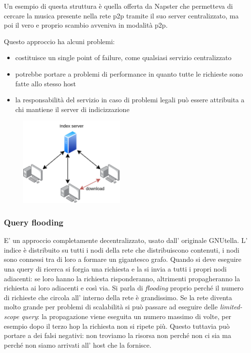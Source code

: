 Un esempio di questa struttura è quella offerta da Napster che permetteva di cercare la musica presente nella rete p2p tramite il suo server centralizzato, ma poi il vero e proprio scambio avveniva in modalità p2p.

Questo approccio ha alcuni problemi:
\begin{itemize}
    \item costituisce un single point of failure, come qualsiasi servizio centralizzato
    \item potrebbe portare a problemi di performance in quanto tutte le richieste sono fatte allo stesso host
    \item la responsabilità del servizio in caso di problemi legali può essere attribuita a chi mantiene il server di indicizzazione
\end{itemize}

\begin{figure}[H]
    \centering
    \includegraphics[width=200px]{images/2_Applicazioni_di_rete/centralized_index.png}
\end{figure}

\subsubsection{Query flooding}
E' un approccio completamente decentralizzato, usato dall' originale GNUtella.
L' indice è distribuito su tutti i nodi della rete che distribuiscono contenuti, i nodi sono connessi tra di loro a formare un gigantesco grafo.
Quando si deve eseguire una query di ricerca si forgia una richiesta e la si invia a tutti i propri nodi adiacenti: se loro hanno la richiesta risponderanno, altrimenti propagheranno la richiesta ai loro adiacenti e così via.
Si parla di \emph{flooding} proprio perché il numero di richieste che circola all' interno della rete è grandissimo. Se la rete diventa molto grande per problemi di scalabilità si può passare ad eseguire delle \emph{limited-scope query}: la propagazione viene eseguita un numero massimo di volte, per esempio dopo il terzo hop la richiesta non si ripete più.
Questo tuttavia può portare a dei falsi negativi: non troviamo la risorsa non perché non ci sia ma perché non siamo arrivati all' host che la fornisce.

